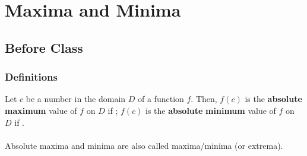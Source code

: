 \documentclass[notes]{subfiles}
\begin{document}
	\setcounter{section}{2}
	\fancyhead[LO,RE]{\bfseries \small \currentname}
	\fancyfoot[C]{{}}
	\fancyfoot[LO,RE]{\large \thepage}	%
	
\section*{Maxima and Minima}\label{cs43}
	\subsection*{Before Class}
	\subsubsection*{Definitions}
		\begin{defn}
			Let \(c\) be a number in the domain \(D\) of a function \(f\).  Then, \(f(c)\) is the \textbf{absolute maximum}\vspace{15pt} value of \(f\) on \(D\) if ; \(f(c)\) is the \textbf{absolute}\vspace{15pt} \textbf{minimum} value of \(f\) on \(D\) if .\\ \\
				Absolute maxima and minima are also called  maxima/minima (or extrema).
		\end{defn}
		
\end{document}
